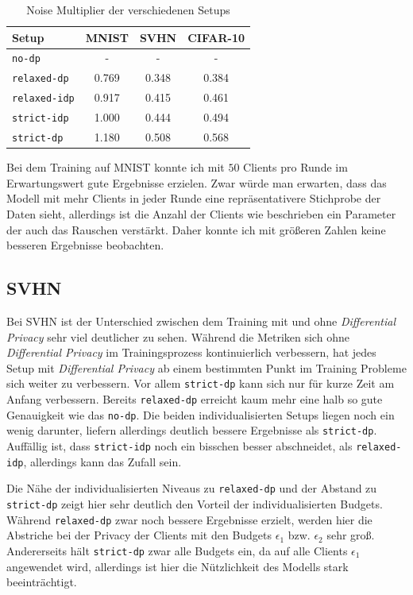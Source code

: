 \begin{table}
	\centering
	\begin{tabular}{lccc}
		\toprule
		Setup & MNIST & SVHN & CIFAR-10 \\
		\midrule
		\texttt{no-dp} & - & - & - \\
		\texttt{relaxed-dp} & 0.769 & 0.348 & 0.384 \\
		\texttt{relaxed-idp} & 0.917 & 0.415 & 0.461 \\
		\texttt{strict-idp} & 1.000 & 0.444 & 0.494 \\
		\texttt{strict-dp} & 1.180 & 0.508 & 0.568 \\
		\bottomrule
	\end{tabular}
	\caption{Noise Multiplier der verschiedenen Setups}
	\label{tab:noise-multipliers}
\end{table}

Bei dem Training auf MNIST konnte ich mit $50$ Clients pro Runde im Erwartungswert gute Ergebnisse erzielen. Zwar würde man erwarten, dass das Modell mit mehr Clients in jeder Runde eine repräsentativere Stichprobe der Daten sieht, allerdings ist die Anzahl der Clients wie beschrieben ein Parameter der auch das Rauschen verstärkt. Daher konnte ich mit größeren Zahlen keine besseren Ergebnisse beobachten.

\subsection{SVHN}

Bei SVHN ist der Unterschied zwischen dem Training mit und ohne \textit{Differential Privacy} sehr viel deutlicher zu sehen. Während die Metriken sich ohne \textit{Differential Privacy} im Trainingsprozess kontinuierlich verbessern, hat jedes Setup mit \textit{Differential Privacy} ab einem bestimmten Punkt im Training Probleme sich weiter zu verbessern. Vor allem \texttt{strict-dp} kann sich nur für kurze Zeit am Anfang verbessern. Bereits \texttt{relaxed-dp} erreicht kaum mehr eine halb so gute Genauigkeit wie das \texttt{no-dp}. Die beiden individualisierten Setups liegen noch ein wenig darunter, liefern allerdings deutlich bessere Ergebnisse als \texttt{strict-dp}. Auffällig ist, dass \texttt{strict-idp} noch ein bisschen besser abschneidet, als \texttt{relaxed-idp}, allerdings kann das Zufall sein.

Die Nähe der individualisierten Niveaus zu \texttt{relaxed-dp} und der Abstand zu \texttt{strict-dp} zeigt hier sehr deutlich den Vorteil der individualisierten Budgets. Während \texttt{relaxed-dp} zwar noch bessere Ergebnisse erzielt, werden hier die Abstriche bei der Privacy der Clients mit den Budgets $\epsilon_1$ bzw. $\epsilon_2$ sehr groß. Andererseits hält \texttt{strict-dp} zwar alle Budgets ein, da auf alle Clients $\epsilon_1$ angewendet wird, allerdings ist hier die Nützlichkeit des Modells stark beeinträchtigt.

